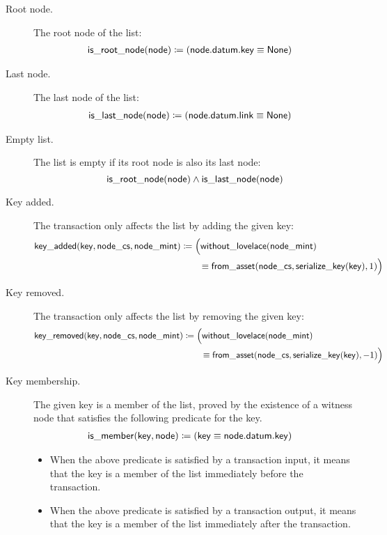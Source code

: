 \documentclass[../midgard.tex]{subfiles}
\begin{document}
\begin{description}
    \item[Root node.] The root node of the list:
        \begin{align*}
            \mathsf{is\_root\_node} (\mathsf{node}) &\coloneq
              ( \mathsf{node.datum.key} \equiv \mathsf{None} )
        \end{align*}
        
    \item[Last node.] The last node of the list:
        \begin{align*}
            \mathsf{is\_last\_node} (\mathsf{node}) &\coloneq
              ( \mathsf{node.datum.link} \equiv \mathsf{None} )
        \end{align*}

    \item[Empty list.] The list is empty if its root node is also its last node:
        \begin{equation*}
            \mathsf{is\_root\_node}(\mathsf{node}) \land
            \mathsf{is\_last\_node}(\mathsf{node})
        \end{equation*}
    
    \item[Key added.] The transaction only affects the list by adding the given key:
        \begin{align*}
            \mathsf{key\_added} (\mathsf{key}, \mathsf{node\_cs}, \mathsf{node\_mint}) &\coloneq
                \Bigl( \mathsf{without\_lovelace}(\mathsf{node\_mint}) \\ &\qquad\equiv
                  \mathsf{from\_asset}(\mathsf{node\_cs}, \mathsf{serialize\_key}(\mathsf{key}), 1)
                \Bigr)
        \end{align*}

    \item[Key removed.] The transaction only affects the list by removing the given key:
        \begin{align*}
            \mathsf{key\_removed} (\mathsf{key}, \mathsf{node\_cs}, \mathsf{node\_mint}) &\coloneq
                \Bigl( \mathsf{without\_lovelace}(\mathsf{node\_mint}) \\ &\qquad\equiv
                  \mathsf{from\_asset}(\mathsf{node\_cs}, \mathsf{serialize\_key}(\mathsf{key}), -1)
                \Bigr)
        \end{align*}
    
    \item[Key membership.] The given key is a member of the list, proved by the existence of a witness node that satisfies the following predicate for the key.
        \begin{align*}
            \mathsf{is\_member} (\mathsf{key}, \mathsf{node}) &\coloneq
              ( \mathsf{key} \equiv \mathsf{node.datum.key} )
        \end{align*}
        \begin{itemize}
            \item When the above predicate is satisfied by a transaction input, it means that the key is a member of the list immediately before the transaction.
            \item When the above predicate is satisfied by a transaction output, it means that the key is a member of the list immediately after the transaction. 
        \end{itemize}


\end{description}
\end{document}
